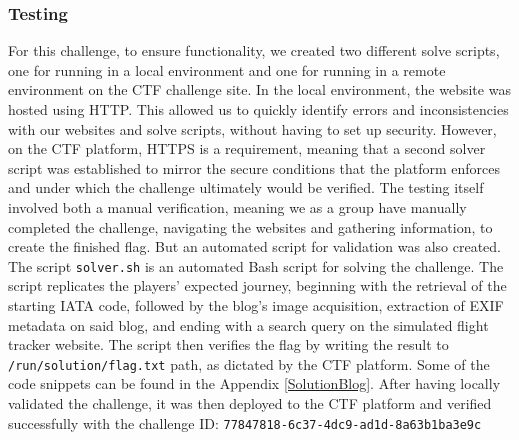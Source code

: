 \subsubsection{Testing}
For this challenge, to ensure functionality, we created two different solve scripts, one for running in a local environment and one for running in a remote environment on the CTF challenge site. In the local environment, the website was hosted using HTTP. This allowed us to quickly identify errors and inconsistencies with our websites and solve scripts, without having to set up security. However, on the CTF platform, HTTPS is a requirement, meaning that a second solver script was established to mirror the secure conditions that the platform enforces and under which the challenge ultimately would be verified. The testing itself involved both a manual verification, meaning we as a group have manually completed the challenge, navigating the websites and gathering information, to create the finished flag. But an automated script for validation was also created. The script \texttt{solver.sh} is an automated Bash script for solving the challenge. The script replicates the players' expected journey, beginning with the retrieval of the starting IATA code, followed by the blog's image acquisition, extraction of EXIF metadata on said blog, and ending with a search query on the simulated flight tracker website. The script then verifies the flag by writing the result to \texttt{/run/solution/flag.txt} path, as dictated by the CTF platform. Some of the code snippets can be found in the Appendix \ref{SolutionBlog}. After having locally validated the challenge, it was then deployed to the CTF platform and verified successfully with the challenge ID: \texttt{77847818-6c37-4dc9-ad1d-8a63b1ba3e9c}


